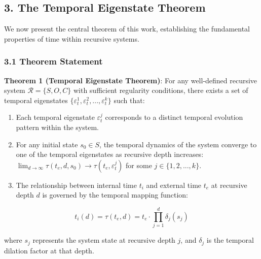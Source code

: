 \documentclass[
]{article}
\begin{document}
\subsection{3. The Temporal Eigenstate
Theorem}\label{the-temporal-eigenstate-theorem}

We now present the central theorem of this work, establishing the
fundamental properties of time within recursive systems.

\subsubsection{3.1 Theorem Statement}\label{theorem-statement-1}

\textbf{Theorem 1 (Temporal Eigenstate Theorem)}: For any well-defined
recursive system \(\mathcal{R} = \{S, O, C\}\) with sufficient
regularity conditions, there exists a set of temporal eigenstates
\(\{\varepsilon_t^1, \varepsilon_t^2, ..., \varepsilon_t^k\}\) such
that:

\begin{enumerate}
\def\labelenumi{\arabic{enumi}.}
\item
  Each temporal eigenstate \(\varepsilon_t^j\) corresponds to a distinct
  temporal evolution pattern within the system.
\item
  For any initial state \(s_0 \in S\), the temporal dynamics of the
  system converge to one of the temporal eigenstates as recursive depth
  increases:
  \(\lim_{d \to \infty} \tau(t_e, d, s_0) \to \tau(t_e, \varepsilon_t^j)\)
  for some \(j \in \{1, 2, ..., k\}\).
\item
  The relationship between internal time \(t_i\) and external time
  \(t_e\) at recursive depth \(d\) is governed by the temporal mapping
  function:
\end{enumerate}

\[t_i(d) = \tau(t_e, d) = t_e \cdot \prod_{j=1}^{d} \delta_j(s_j)\]

where \(s_j\) represents the system state at recursive depth \(j\), and
\(\delta_j\) is the temporal dilation factor at that depth.
\end{document}
